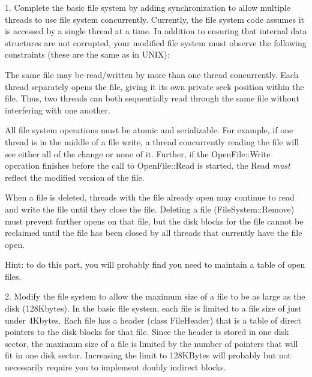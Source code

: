 \begin{description}
\item{1.}
Complete the basic file system by adding synchronization to
allow multiple threads to use file system concurrently.  Currently,
the file system code assumes it is accessed by a single thread at a time.
In addition to ensuring that internal 
data structures are not corrupted, your modified file system must 
observe the following constraints (these are the same as in UNIX):

\begin{description}
\item The same file may be read/written by more than 
one thread concurrently.  Each thread separately opens the file,
giving it its own private seek position within the file.  
Thus, two threads can both sequentially read through the same file
without interfering with one another.

\item All file system operations must be atomic and serializable.
For example, if one thread is in the middle of a file write,
a thread concurrently reading the file will see either all of the change or
none of it.  Further, if the OpenFile::Write operation finishes
before the call to OpenFile::Read is started, the Read {\em must} reflect
the modified version of the file.

\item When a file is deleted, threads with the file already open 
may continue to read and write the file until they close the file.
Deleting a file (FileSystem::Remove) must prevent further opens on 
that file, but the disk blocks for the file cannot be reclaimed 
until the file has been closed by all threads that currently have the 
file open.

\end{description}

Hint: to do this part, you will probably find you need to maintain 
a table of open files.

\item{2.}
Modify the file system to allow the maximum size of a file to be as large 
as the disk (128Kbytes).  In the basic file system, each file is limited 
to a file size of just under 4Kbytes.  Each file has a header 
(class FileHeader) that is a table of direct pointers to the disk blocks 
for that file.  Since the header is stored in one disk sector, the 
maximum size of a file is limited by the number of pointers that will 
fit in one disk sector.  Increasing the limit to 128KBytes will probably
but not necessarily require you to implement doubly indirect blocks.


\end{description}
